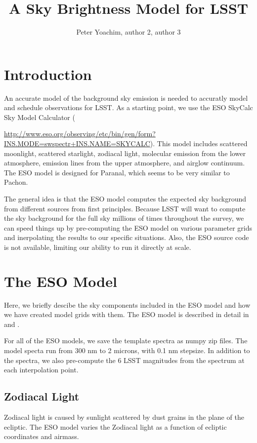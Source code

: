 \documentclass{emulateapj}  %
\begin{document}
\title{A Sky Brightness Model for LSST}


\author{Peter Yoachim, author 2, author 3}




\section{Introduction}

An accurate model of the background sky emission is needed to accuratly model and schedule observations for LSST.  As a starting point, we use the ESO SkyCalc Sky Model Calculator ({\url{http://www.eso.org/observing/etc/bin/gen/form?INS.MODE=swspectr+INS.NAME=SKYCALC}).  This model includes scattered moonlight, scattered starlight, zodiacal light, molecular emission from the lower atmosphere, emission lines from the upper atmosphere, and airglow continuum.  The ESO model is designed for Paranal, which seems to be very similar to Pachon.  

The general idea is that the ESO model computes the expected sky background from different sources from first principles. Because LSST will want to compute the sky background for the full sky millions of times throughout the survey, we can speed things up by pre-computing the ESO model on various parameter grids and inerpolating the results to our specific situations. Also, the ESO source code is not available, limiting our ability to run it directly at scale.

\section{The ESO Model}
Here, we briefly descibe the sky components included in the ESO model and how we have created model grids with them. The ESO model is described in detail in \citet{Noll12} and \citet{Jones13}.

For all of the ESO models, we save the template spectra as numpy zip files.  The model specta run from 300 nm to 2 microns, with 0.1 nm stepsize.  In addition to the spectra, we also pre-compute the 6 LSST magnitudes from the spectrum at each interpolation point.

\subsection{Zodiacal Light}
Zodiacal light is caused by sunlight scattered by dust grains in the plane of the ecliptic.  The ESO model varies the Zodiacal light as a function of ecliptic coordinates and airmass.  

}
\end{document}
